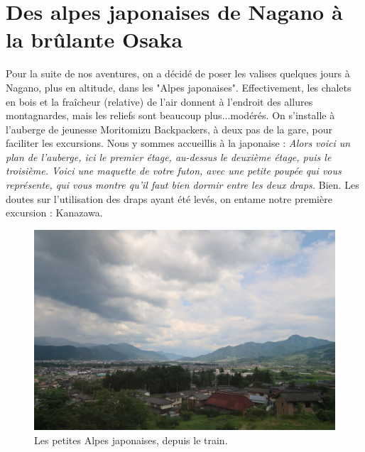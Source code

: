 \hypertarget{des-alpes-japonaises-de-nagano-uxe0-la-bruxfblante-osaka}{%
\section{Des alpes japonaises de Nagano à la brûlante
Osaka}\label{des-alpes-japonaises-de-nagano-uxe0-la-bruxfblante-osaka}}

Pour la suite de nos aventures, on a décidé de poser les valises
quelques jours à Nagano, plus en altitude, dans les "Alpes japonaises".
Effectivement, les chalets en bois et la fraîcheur (relative) de l'air
donnent à l'endroit des allures montagnardes, mais les reliefs sont
beaucoup plus...modérés. On s'installe à l'auberge de jeunesse
Moritomizu Backpackers, à deux pas de la gare, pour faciliter les
excursions. Nous y sommes accueillis à la japonaise : \emph{Alors voici
un plan de l'auberge, ici le premier étage, au-dessus le deuxième étage,
puis le troisième. Voici une maquette de votre futon, avec une petite
poupée qui vous représente, qui vous montre qu'il faut bien dormir entre
les deux draps.} Bien. Les doutes sur l'utilisation des draps ayant été
levés, on entame notre première excursion : Kanazawa.

\begin{figure}
\centering
\includegraphics{images/20180723_nagano.JPG}
\caption{Les petites Alpes japonaises, depuis le train.}
\end{figure}

